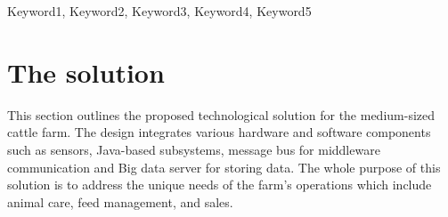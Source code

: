\documentclass[conference]{IEEEtran}
\begin{document}
\maketitle
\IEEEpubidadjcol
\begin{abstract}





\end{abstract}

\begin{IEEEkeywords}
    Keyword1, Keyword2, Keyword3, Keyword4, Keyword5
\end{IEEEkeywords}



\vspace{1cm}



\vspace{1cm}



\vspace{1cm}


\section{The solution}
\label{sec:middleware_architecture}

This section outlines the proposed technological solution for the medium-sized cattle farm. The design integrates various hardware and software components such as sensors, Java-based subsystems, message bus for middleware communication and Big data server for storing data. The whole purpose of this solution is to address the unique needs of the farm's operations which include animal care, feed management, and sales.
\end{document}
